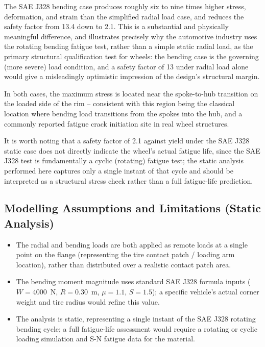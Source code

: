\documentclass[11pt]{article}
\begin{document}
The SAE J328 bending case produces roughly six to nine times higher stress, deformation,
and strain than the simplified radial load case, and reduces the safety factor from 13.4
down to 2.1. This is a substantial and physically meaningful difference, and illustrates
precisely why the automotive industry uses the rotating bending fatigue test, rather than
a simple static radial load, as the primary structural qualification test for wheels: the
bending case is the governing (more severe) load condition, and a safety factor of 13
under radial load alone would give a misleadingly optimistic impression of the design's
structural margin.

In both cases, the maximum stress is located near the spoke-to-hub transition on the
loaded side of the rim -- consistent with this region being the classical location where
bending load transitions from the spokes into the hub, and a commonly reported fatigue
crack initiation site in real wheel structures.

It is worth noting that a safety factor of 2.1 against yield under the SAE J328 static
case does not directly indicate the wheel's actual fatigue life, since the SAE J328 test
is fundamentally a cyclic (rotating) fatigue test; the static analysis performed here
captures only a single instant of that cycle and should be interpreted as a structural
stress check rather than a full fatigue-life prediction.

\subsection{Modelling Assumptions and Limitations (Static Analysis)}

\begin{itemize}
    \item The radial and bending loads are both applied as remote loads at a single point
    on the flange (representing the tire contact patch / loading arm location), rather
    than distributed over a realistic contact patch area.
    \item The bending moment magnitude uses standard SAE J328 formula inputs
    ($W = 4000$~N, $R = 0.30$~m, $\mu = 1.1$, $S = 1.5$); a specific vehicle's actual
    corner weight and tire radius would refine this value.
    \item The analysis is static, representing a single instant of the SAE J328 rotating
    bending cycle; a full fatigue-life assessment would require a rotating or cyclic
    loading simulation and S-N fatigue data for the material.
\end{itemize}
\end{document}

